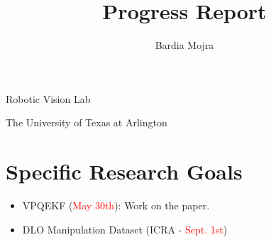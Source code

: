 \documentclass[11pt]{article}
\title{Progress Report}
\author{Bardia Mojra}
\begin{document}
\maketitle
\thispagestyle{empty}

\bigskip
\bigskip
\begin{center}
 Robotic Vision Lab
\end{center}

\begin{center}
The University of Texas at Arlington
\end{center}

\newpage

\section{Specific Research Goals}
\begin{itemize}
      \item VPQEKF (\textcolor{red}{May 30th}): Work on the paper.
      \item DLO Manipulation Dataset (ICRA - \textcolor{red}{Sept. 1st})
\end{itemize}
\end{document}
